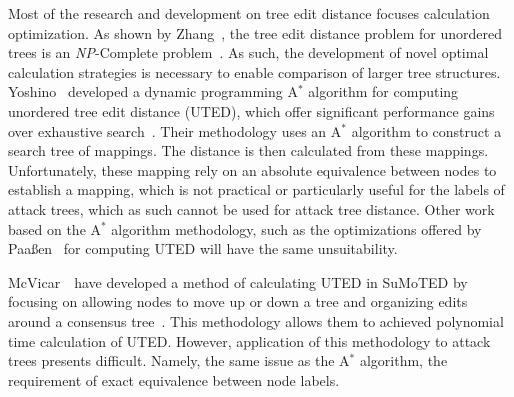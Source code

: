 Most of the research and development on tree edit distance focuses calculation optimization. As shown by Zhang~\etal, the tree edit distance problem for unordered trees is an \textit{NP}-Complete problem~\cite{zhang_editing_1992}. As such, the development of novel optimal calculation strategies is necessary to enable comparison of larger tree structures. Yoshino \etal\ developed a dynamic programming A$^*$ algorithm for computing unordered tree edit distance (UTED), which offer significant performance gains over exhaustive search~\cite{yoshino_dynamic_2013}. Their methodology uses an A$^*$ algorithm to construct a search tree of mappings. The distance is then calculated from these mappings. Unfortunately, these mapping rely on an absolute equivalence between nodes to establish a mapping, which is not practical or particularly useful for the labels of attack trees, which as such cannot be used for attack tree distance.
Other work based on the A$^*$ algorithm methodology, such as the optimizations offered by Paaßen~\cite{paasen_-algorithm_2021} for computing UTED will have the same unsuitability.

McVicar~\etal\ have developed a method of calculating UTED in SuMoTED by focusing on allowing nodes to move up or down a tree and organizing edits around a consensus tree~\cite{mcvicar_sumoted_2016}. This methodology allows them to achieved polynomial time calculation of UTED. However, application of this methodology to attack trees presents difficult. Namely, the same issue as the A$^*$ algorithm, the requirement of exact equivalence between node labels.


